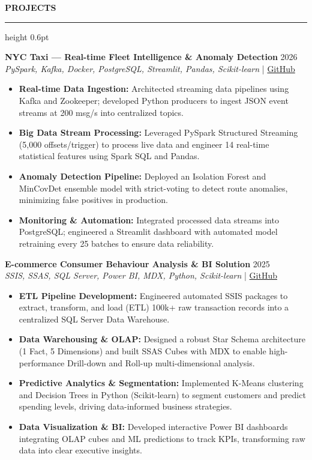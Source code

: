 ﻿\documentclass{resume}
\renewcommand{\sectionskip}{\vspace{5pt}}
\renewcommand{\sectionlineskip}{\vspace{3pt}}
\renewenvironment{rSection}[1]{
  \sectionskip
  {\color{headerblue}\textbf{\MakeUppercase{#1}}}
  \sectionlineskip
  {\color{rulegray}\hrule height 0.6pt}
  \vspace{0pt}
  \begin{list}{}{
    \setlength{\leftmargin}{0em}
    \setlength{\topsep}{0pt}
    \setlength{\partopsep}{0pt}
    \setlength{\parsep}{0pt}
    \setlength{\itemsep}{0pt}
  }
  \item[]
}{
  \end{list}
}
\begin{document}
\begin{rSection}{Projects}
    \item \textbf{NYC Taxi — Real-time Fleet Intelligence \& Anomaly Detection} \hfill 2026\\
    {\small \textit{PySpark, Kafka, Docker, PostgreSQL, Streamlit, Pandas, Scikit-learn}} \hfill | \href{https://github.com/vietpham10205/real-time-Fleet-Intelligence-anomaly-detection-dashboard}{GitHub}
    {\small
    \begin{itemize}[itemsep=4pt, parsep=0pt, leftmargin=1.2em]
        \item \textbf{Real-time Data Ingestion:} Architected streaming data pipelines using Kafka and Zookeeper; developed Python producers to ingest JSON event streams at 200 msg/s into centralized topics.
        \item \textbf{Big Data Stream Processing:} Leveraged PySpark Structured Streaming (5,000 offsets/trigger) to process live data and engineer 14 real-time statistical features using Spark SQL and Pandas.
        \item \textbf{Anomaly Detection Pipeline:} Deployed an Isolation Forest and MinCovDet ensemble model with strict-voting to detect route anomalies, minimizing false positives in production.
        \item \textbf{Monitoring \& Automation:} Integrated processed data streams into PostgreSQL; engineered a Streamlit dashboard with automated model retraining every 25 batches to ensure data reliability.
    \end{itemize}
    }
    \vspace{15pt}

    \item \textbf{E-commerce Consumer Behaviour Analysis \& BI Solution} \hfill 2025\\
    {\small \textit{SSIS, SSAS, SQL Server, Power BI, MDX, Python, Scikit-learn}} \hfill | \href{https://github.com/vietpham10205/Datawarehouse-Olap_Project-E-commerce-Consumer-Behavior-Analysis-BI-Solution}{GitHub}
    {\small
    \begin{itemize}[itemsep=4pt, parsep=0pt, leftmargin=1.2em]
        \item \textbf{ETL Pipeline Development:} Engineered automated SSIS packages to extract, transform, and load (ETL) 100k+ raw transaction records into a centralized SQL Server Data Warehouse.
        \item \textbf{Data Warehousing \& OLAP:} Designed a robust Star Schema architecture (1 Fact, 5 Dimensions) and built SSAS Cubes with MDX to enable high-performance Drill-down and Roll-up multi-dimensional analysis.
        \item \textbf{Predictive Analytics \& Segmentation:} Implemented K-Means clustering and Decision Trees in Python (Scikit-learn) to segment customers and predict spending levels, driving data-informed business strategies.
        \item \textbf{Data Visualization \& BI:} Developed interactive Power BI dashboards integrating OLAP cubes and ML predictions to track KPIs, transforming raw data into clear executive insights.
    \end{itemize}
    }
\end{rSection}
\end{document}
